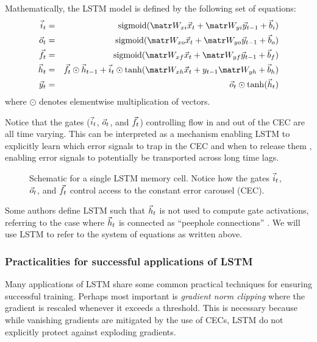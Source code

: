 Mathematically, the LSTM model is defined by the following set of equations:
\begin{align}
    \i_t &=& \sigmoid(\W_{xi} \x_t + \W_{yi} \y_{t-1} + \b_i) \\
    \o_t &=& \sigmoid(\W_{xo} \x_t + \W_{yo} \y_{t-1} + \b_o) \\
    \f_t &=& \sigmoid(\W_{xf} \x_t + \W_{yf} \y_{t-1} + \b_f) \\
    \h_t &=& \f_t \odot \h_{t-1} + \i_t \odot \tanh(\W_{xh}\x_t + y_{t-1} \W_{yh} + \b_h) \label{eq:lstm-dynamics} \\
    \y_t &=& \o_t \odot \tanh(\h_t)
\end{align}
where $\odot$ denotes elementwise multiplication of vectors.

Notice that the gates ($\vec{i}_t$, $\vec{o}_t$, and $\vec{f}_t$) controlling flow in and out
of the CEC are all time varying. This can be interpreted as a mechanism
enabling LSTM to explicitly learn which error signals to trap in the CEC and
when to release them \citep{hochreiter1997long}, enabling error signals to
potentially be transported across long time lags.

\begin{figure}[tb]
    \centering
    
    \caption{Schematic for a single LSTM memory cell. Notice how the gates $\vec{i}_t$, $\vec{o}_t$, and $\vec{f}_t$ control access to the constant error carousel (CEC).}
    \label{fig:lstm-cell}
\end{figure}

Some authors define LSTM such that $\vec{h}_t$ is not used to compute gate
activations, referring to the case where $\vec{h}_t$ is connected as ``peephole
connections'' \citep{gers2000recurrent}. We will use LSTM to refer to the
system of equations as written above.

\subsubsection{Practicalities for successful applications of LSTM}

Many applications of LSTM  share some common practical
techniques for ensuring successful training. Perhaps most important is
\emph{gradient norm clipping} \citep{Mikolov2012,Pascanu2012} where the
gradient is rescaled whenever it exceeds a threshold. This is necessary because
while vanishing gradients are mitigated by the use of CECs, LSTM do not
explicitly protect against exploding gradients.

